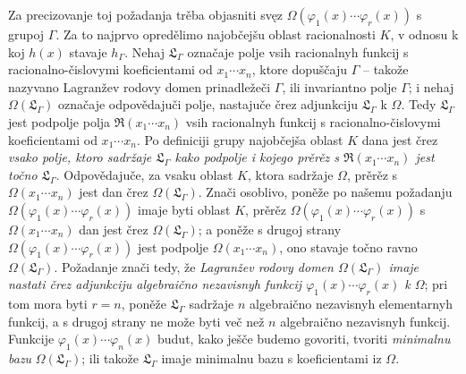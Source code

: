 \documentclass[11pt]{article}
\begin{document}
Za precizovanje toj požadanja trěba objasniti svęz $\Omega(\varphi_1(x)\cdots\varphi_r(x))$ s grupoj $\Gamma$. Za to najprvo opredělimo najobčejšu oblast racionalnosti $K$, v odnosu k koj $h(x)$ stavaje $h_\Gamma$. Nehaj $\mathfrak L_\Gamma$ označaje polje vsih racionalnyh funkcij s racionalno-čislovymi koeficientami od $x_1\cdots x_n$, ktore dopuščaju $\Gamma$ -- takože nazyvano Lagranžev rodovy domen prinadležeči $\Gamma$, ili invariantno polje $\Gamma$; i nehaj $\Omega(\mathfrak L_\Gamma)$ označaje odpovědajuči polje, nastajuče črez adjunkciju $\mathfrak L_\Gamma$ k $\Omega$. Tedy $\mathfrak L_\Gamma$ jest podpolje polja $\mathfrak R(x_1\cdots x_n)$ vsih racionalnyh funkcij s racionalno-čislovymi koeficientami od $x_1\cdots x_n$. Po definiciji grupy najobčejša oblast $K$ dana jest črez {\itshape vsako polje, ktoro sadržaje $\mathfrak L_\Gamma$ kako podpolje i kojego prěrěz s $\mathfrak R(x_1\cdots x_n)$ jest točno $\mathfrak L_\Gamma$}. Odpovědajuče, za vsaku oblast $K$, ktora sadržaje $\Omega$, prěrěz s $\Omega(x_1\cdots x_n)$ jest dan črez $\Omega(\mathfrak L_\Gamma)$. Znači osoblivo, poněže po našemu požadanju $\Omega(\varphi_1(x)\cdots\varphi_r(x))$ imaje byti oblast $K$, prěrěz $\Omega(\varphi_1(x)\cdots\varphi_r(x))$ s $\Omega(x_1\cdots x_n)$ dan jest črez $\Omega(\mathfrak L_\Gamma)$; a poněže s drugoj strany $\Omega(\varphi_1(x)\cdots\varphi_r(x))$ jest podpolje $\Omega(x_1\cdots x_n)$, ono stavaje točno ravno $\Omega(\mathfrak L_\Gamma)$. Požadanje znači tedy, že {\itshape Lagranžev rodovy domen $\Omega(\mathfrak L_\Gamma)$ imaje nastati črez adjunkciju algebraično nezavisnyh funkcij $\varphi_1(x)\cdots\varphi_r(x)$ k $\Omega$}; pri tom mora byti $r=n$, poněže $\mathfrak L_\Gamma$ sadržaje $n$ algebraično nezavisnyh elementarnyh funkcij, a s drugoj strany ne može byti več než $n$ algebraično nezavisnyh funkcij. Funkcije $\varphi_1(x)\cdots\varphi_n(x)$ budut, kako ješče budemo govoriti, tvoriti {\itshape minimalnu bazu} $\Omega(\mathfrak L_\Gamma)$; ili takože $\mathfrak L_\Gamma$ imaje minimalnu bazu s koeficientami iz $\Omega$.
\end{document}

